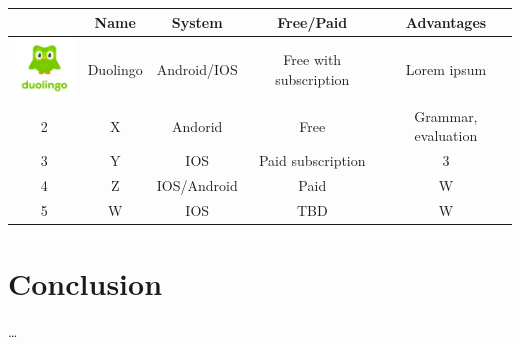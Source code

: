 \documentclass[10pt,english,a4paper]{article}
\begin{document}
\begin{center}
 \begin{tabular}{|| c | c | c | c | c ||} 
 \hline
     & Name & System & Free/Paid & Advantages  \\ 
 \hline\hline
 \includegraphics[width=2cm]{images/Duolingo logo.png} & Duolingo & Android/IOS & Free with subscription & Lorem ipsum \\ 
 \hline
 2 & X & Andorid & Free & Grammar, evaluation \\
 \hline
 3 & Y & IOS & Paid subscription & 3 \\
 \hline
 4 & Z & IOS/Android & Paid & W \\
 \hline
 5 & W & IOS & TBD & W \\
 \hline
 \end{tabular}
\end{center}

\section{Conclusion} 

\ldots






\end{document}
